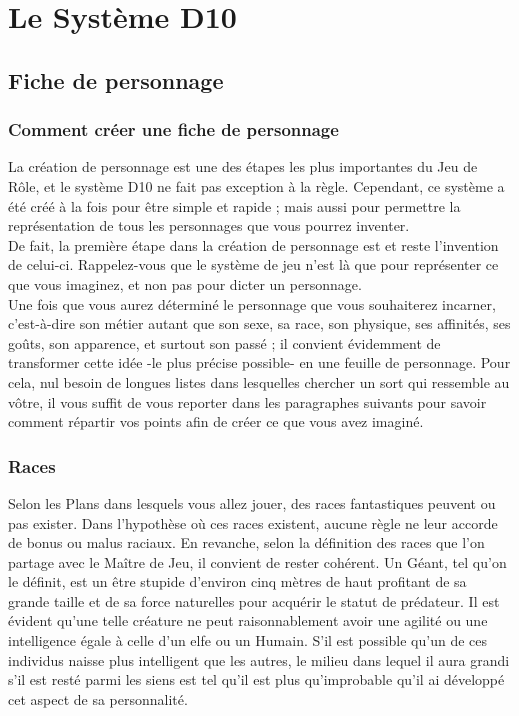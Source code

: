 \chapter{Le Système D10}
\section{Fiche de personnage}
\subsection{Comment créer une fiche de personnage}

La création de personnage est une des étapes les plus importantes du Jeu de Rôle, et le système D10 ne fait pas exception à la règle. Cependant, ce système a été créé à la fois pour être simple et rapide ; mais aussi pour permettre la représentation de tous les personnages que vous pourrez inventer.\\
De fait, la première étape dans la création de personnage est et reste l’invention de celui-ci. Rappelez-vous que le système de jeu n’est là que pour représenter ce que vous imaginez, et non pas pour dicter un personnage.\\

Une fois que vous aurez déterminé le personnage que vous souhaiterez incarner, c’est-à-dire son métier autant que son sexe, sa race, son physique, ses affinités, ses goûts, son apparence, et surtout son passé ; il convient évidemment de transformer cette idée -le plus précise possible- en une feuille de personnage. Pour cela, nul besoin de longues listes dans lesquelles chercher un sort qui ressemble au vôtre, il vous suffit de vous reporter dans les paragraphes suivants pour savoir comment répartir vos points afin de créer ce que vous avez imaginé.

\subsection{Races}

Selon les Plans dans lesquels vous allez jouer, des races fantastiques peuvent ou pas exister. Dans l’hypothèse où ces races existent, aucune règle ne leur accorde de bonus ou malus raciaux. En revanche, selon la définition des races que l’on partage avec le Maître de Jeu, il convient de rester cohérent. Un Géant, tel qu’on le définit, est un être stupide d’environ cinq mètres de haut profitant de sa grande taille et de sa force naturelles pour acquérir le statut de prédateur. Il est évident qu’une telle créature ne peut raisonnablement avoir une agilité ou une intelligence égale à celle d’un elfe ou un Humain. S’il est possible qu’un de ces individus naisse plus intelligent que les autres, le milieu dans lequel il aura grandi s’il est resté parmi les siens est tel qu’il est plus qu’improbable qu’il ai développé cet aspect de sa personnalité.\\

